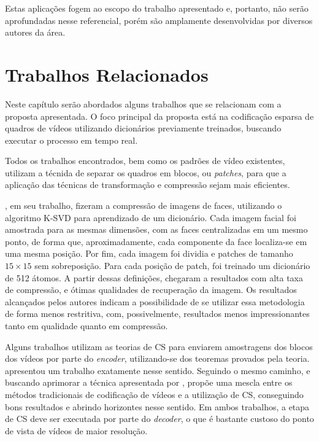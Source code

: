 \documentclass[cic,tc]{iiufrgs}
\begin{document}
Estas aplicações fogem ao escopo do trabalho apresentado e, portanto, não serão
aprofundadas nesse referencial, porém são amplamente desenvolvidas por diversos
autores da área.



\chapter{Trabalhos Relacionados}
\label{cap:relacionados}
Neste capítulo serão abordados alguns trabalhos que se relacionam com a proposta apresentada.
O foco principal da proposta está na codificação esparsa de quadros de vídeos utilizando dicionários
previamente treinados, buscando executar o processo em tempo real.

Todos os trabalhos encontrados, bem como os padrões de vídeo existentes,
utilizam a técnida de separar os quadros em blocos, ou \textit{patches},
para que a aplicação das técnicas de transformação e compressão sejam 
mais eficientes.

\citet{BRYTFACEKSVD}, em seu trabalho, fizeram a compressão de imagens de faces, 
utilizando o algoritmo K-SVD para aprendizado de um dicionário. 
Cada imagem facial foi amostrada para as mesmas dimensões, com as faces centralizadas
em um mesmo ponto, de forma que, aproximadamente, cada componente da face localiza-se
em uma mesma posição.
Por fim, cada imagem foi dividia e patches de tamanho $15\times 15$ sem sobreposição.
Para cada posição de patch, foi treinado um dicionário
de 512 átomos. A partir dessas definições, \citet{BRYTFACEKSVD} chegaram a resultados 
com alta taxa de compressão, e ótimas qualidades de recuperação da imagem.
Os resultados alcançados pelos autores indicam a possibilidade de se utilizar essa
metodologia de forma menos restritiva, com, possivelmente, resultados menos impressionantes
tanto em qualidade quanto em compressão.

Alguns trabalhos utilizam as teorias de CS para enviarem amostragens dos blocos
dos vídeos por parte do \textit{encoder}, utilizando-se dos teoremas provados pela teoria.
\citet{NebotDVC} apresentou um trabalho exatamente nesse sentido.
Seguindo o mesmo caminho, e buscando aprimorar a técnica apresentada por \citeauthor{NebotDVC}, 
\citet{DoDISCOS} propõe uma mescla entre os métodos tradicionais de codificação de vídeos
e a utilização de CS, conseguindo bons resultados e abrindo horizontes nesse sentido.
Em ambos trabalhos, a etapa de CS deve ser executada por parte do \textit{decoder}, 
o que é bastante custoso do ponto de vista de vídeos de maior resolução.
\end{document}
